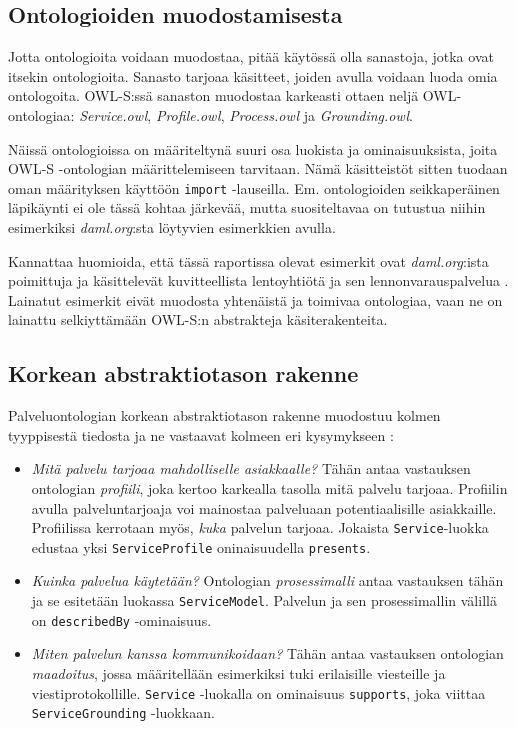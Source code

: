 \documentclass[finnish]{tktltiki2}
\theoremstyle{definition}
\theoremstyle{remark}
\begin{document}
\subsection{Ontologioiden muodostamisesta}

Jotta ontologioita voidaan muodostaa, pitää käytössä olla sanastoja, jotka ovat itsekin ontologioita. Sanasto tarjoaa käsitteet, joiden avulla voidaan luoda omia ontologoita. OWL-S:ssä sanaston muodostaa karkeasti ottaen neljä OWL-ontologiaa: \textit{Service.owl}, \textit{Profile.owl}, \textit{Process.owl} ja \textit{Grounding.owl}\cite{OWLS}. 

Näissä ontologioissa on määriteltynä suuri osa luokista ja ominaisuuksista, joita OWL-S -ontologian määrittelemiseen tarvitaan. Nämä käsitteistöt sitten tuodaan oman määrityksen käyttöön \texttt{import} -lauseilla. 
Em. ontologioiden seikkaperäinen läpikäynti ei ole tässä kohtaa järkevää, mutta suositeltavaa on tutustua niihin esimerkiksi \textit{daml.org}:sta löytyvien esimerkkien avulla\cite{daml}. 

Kannattaa huomioida, että tässä raportissa olevat esimerkit ovat \textit{daml.org}:ista poimittuja ja käsittelevät kuvitteellista lentoyhtiötä ja sen lennonvarauspalvelua \cite{daml}. Lainatut esimerkit eivät muodosta yhtenäistä ja toimivaa ontologiaa, vaan ne on lainattu selkiyttämään OWL-S:n abstrakteja käsiterakenteita.

\subsection{Korkean abstraktiotason rakenne}

Palveluontologian korkean abstraktiotason rakenne muodostuu kolmen tyyppisestä tiedosta ja ne vastaavat kolmeen eri kysymykseen \cite{OWLS}:

\begin{itemize}

  \item \textit{Mitä palvelu tarjoaa mahdolliselle asiakkaalle?} Tähän antaa vastauksen ontologian \textit{profiili}, joka kertoo karkealla tasolla mitä palvelu tarjoaa. Profiilin 
 avulla palveluntarjoaja voi mainostaa palveluaan potentiaalisille asiakkaille. Profiilissa kerrotaan myös, \textit{kuka} palvelun tarjoaa. Jokaista \texttt{Service}-luokka edustaa yksi \texttt{ServiceProfile} \cite{OWLS} oninaisuudella \texttt{presents}. 
 
 \item \textit{Kuinka palvelua käytetään?} Ontologian \textit{prosessimalli} antaa vastauksen tähän ja se esitetään luokassa \texttt{ServiceModel}. Palvelun ja sen prosessimallin välillä on \texttt{describedBy} -ominaisuus\cite{OWLS}. 
 
 \item \textit{Miten palvelun kanssa kommunikoidaan?} Tähän antaa vastauksen ontologian \textit{maadoitus}, jossa määritellään esimerkiksi tuki erilaisille viesteille ja  viestiprotokollille. \texttt{Service} -luokalla on ominaisuus \texttt{supports}, joka viittaa \texttt{ServiceGrounding} -luokkaan\cite{OWLS}.  
  
\end{itemize}
\end{document}
